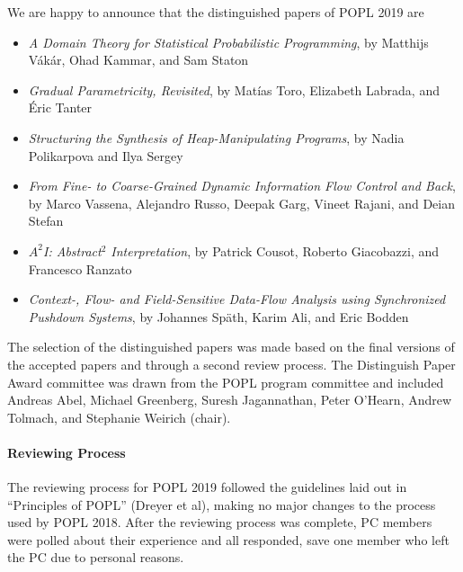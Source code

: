 We are happy to announce that the distinguished papers of POPL 2019 are

\begin{itemize}
\item {\em A Domain Theory for Statistical Probabilistic Programming}, by 
Matthijs V\'{a}k\'{a}r, Ohad Kammar, and Sam Staton
\item {\em Gradual Parametricity, Revisited}, by
Mat\'{i}as Toro, Elizabeth Labrada, and \'{E}ric Tanter
\item {\em Structuring the Synthesis of Heap-Manipulating Programs}, by 
Nadia Polikarpova and Ilya Sergey
\item {\em From Fine- to Coarse-Grained Dynamic Information Flow Control and
    Back}, by
Marco Vassena, Alejandro Russo, Deepak Garg, Vineet Rajani, and Deian Stefan
\item {\em $A^2$I: Abstract$^2$ Interpretation}, by 
Patrick Cousot, Roberto Giacobazzi, and Francesco Ranzato
\item {\em Context-, Flow- and Field-Sensitive Data-Flow Analysis using
  Synchronized Pushdown Systems}, by
Johannes Sp\"{a}th, Karim Ali, and Eric Bodden
\end{itemize}

The selection of the distinguished papers was made based on the final versions
of the accepted papers and through a second review process. The Distinguish
Paper Award committee was drawn from the POPL program committee and included
Andreas Abel, Michael Greenberg, Suresh Jagannathan, Peter O'Hearn, Andrew
Tolmach, and Stephanie Weirich (chair).

\paragraph{Reviewing Process}
%
The reviewing process for POPL 2019 followed the guidelines laid out in
``Principles of POPL'' (Dreyer et al), making no major changes to the process
used by POPL 2018. After the reviewing process was complete, PC members
were polled about their experience and all responded, save one member
who left the PC due to personal reasons.

